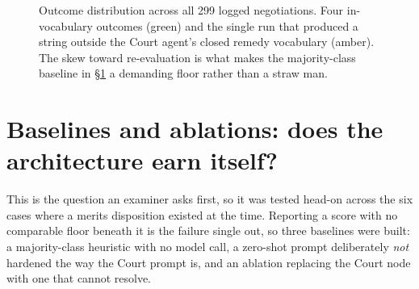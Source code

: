 \begin{figure}[htbp]
\centering
{}
\caption[Outcome distribution]{Outcome distribution across all 299 logged
negotiations. Four in-vocabulary outcomes (green) and the single run that produced
a string outside the Court agent's closed remedy vocabulary (amber). The skew
toward re-evaluation is what makes the majority-class baseline in
\S\ref{sec:baselines} a demanding floor rather than a straw man.}
\label{fig:outcomes}
\end{figure}

\section{Baselines and ablations: does the architecture earn itself?}
\label{sec:baselines}

This is the question an examiner asks first, so it was tested head-on across the
six cases where a merits disposition existed at the time. Reporting a score with
no comparable floor beneath it is the failure \citet{dodge2019showyourwork} single
out, so three baselines were built: a majority-class heuristic with no model call,
a zero-shot prompt deliberately \emph{not} hardened the way the Court prompt is,
and an ablation replacing the Court node with one that cannot resolve.

